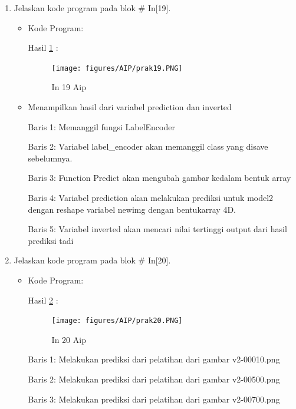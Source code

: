 \begin{enumerate}
\item Jelaskan kode program pada blok \# In[19].
\begin{itemize}
\item Kode Program:

\par Hasil \ref{in19aip} :
\begin{figure}[!hbtp]
\centering
\texttt{[image: figures/AIP/prak19.PNG]}
\caption{In 19 Aip}
\label{in19aip}
\end{figure}
\item Menampilkan hasil dari variabel prediction dan inverted
\par Baris 1: Memanggil fungsi LabelEncoder
\par Baris 2: Variabel label\_encoder akan memanggil class yang disave sebelumnya.
\par Baris 3: Function Predict akan mengubah gambar kedalam bentuk array
\par Baris 4: Variabel prediction akan melakukan prediksi untuk model2 dengan reshape variabel newimg dengan bentukarray 4D.
\par Baris 5: Variabel inverted akan mencari nilai tertinggi output dari hasil prediksi tadi
\end{itemize}
\par

\item Jelaskan kode program pada blok \# In[20].
\begin{itemize}
\item Kode Program:

\par Hasil \ref{in20aip} :
\begin{figure}[!hbtp]
\centering
\texttt{[image: figures/AIP/prak20.PNG]}
\caption{In 20 Aip}
\label{in20aip}
\end{figure}
\par Baris 1: Melakukan prediksi dari pelatihan dari gambar v2-00010.png
\par Baris 2: Melakukan prediksi dari pelatihan dari gambar v2-00500.png
\par Baris 3: Melakukan prediksi dari pelatihan dari gambar v2-00700.png 
\end{itemize}
\par


\end{enumerate}
